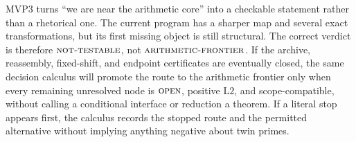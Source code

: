 \documentclass[11pt]{article}
\theoremstyle{definition}
\theoremstyle{remark}
\newcommand{\NT}{\textnormal{\textsc{not-testable}}}
\newcommand{\AF}{\textnormal{\textsc{arithmetic-frontier}}}
\newcommand{\OPEN}{\textnormal{\textsc{open}}}
\newcommand{\Ltwo}{\mathrm{L2}}
\begin{document}
MVP3 turns ``we are near the arithmetic core'' into a checkable
statement rather than a rhetorical one.  The current program has a
sharper map and several exact transformations, but its first missing
object is still structural.  The correct verdict is therefore
\(\NT\), not \(\AF\).  If the archive, reassembly, fixed-shift, and
endpoint certificates are eventually closed, the same decision
calculus will promote the route to the arithmetic frontier only when
every remaining unresolved node is \(\OPEN\), positive \(\Ltwo\), and
scope-compatible, without calling a conditional interface or
reduction a theorem.  If a literal stop appears first, the
calculus records the stopped route and the permitted alternative
without implying anything negative about twin primes.

\begingroup
\small
\setlength{\bibsep}{2pt plus 0.3ex}
\sloppy


\endgroup
\end{document}
